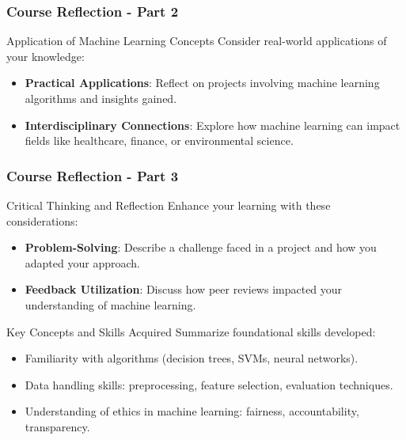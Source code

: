 \documentclass[aspectratio=169]{beamer}
\begin{document}
\begin{frame}[fragile]
    \frametitle{Course Reflection - Part 2}

    \begin{block}{Application of Machine Learning Concepts}
        Consider real-world applications of your knowledge:
        \begin{itemize}
            \item \textbf{Practical Applications}:
            Reflect on projects involving machine learning algorithms and insights gained.
            \item \textbf{Interdisciplinary Connections}:
            Explore how machine learning can impact fields like healthcare, finance, or environmental science.
        \end{itemize}
    \end{block}
\end{frame}

\begin{frame}[fragile]
    \frametitle{Course Reflection - Part 3}

    \begin{block}{Critical Thinking and Reflection}
        Enhance your learning with these considerations:
        \begin{itemize}
            \item \textbf{Problem-Solving}:
            Describe a challenge faced in a project and how you adapted your approach.
            \item \textbf{Feedback Utilization}:
            Discuss how peer reviews impacted your understanding of machine learning.
        \end{itemize}
    \end{block}

    \begin{block}{Key Concepts and Skills Acquired}
        Summarize foundational skills developed:
        \begin{itemize}
            \item Familiarity with algorithms (decision trees, SVMs, neural networks).
            \item Data handling skills: preprocessing, feature selection, evaluation techniques.
            \item Understanding of ethics in machine learning: fairness, accountability, transparency.
        \end{itemize}
    \end{block}
\end{frame}
\end{document}
